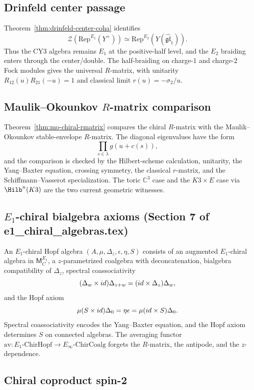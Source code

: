 \documentclass[11pt]{article}
\newcommand{\fgl}{\mathfrak{gl}}
\newcommand{\cZ}{\mathcal{Z}}
\newcommand{\Rep}{\mathrm{Rep}}
\newcommand{\C}{\mathbb{C}}
\theoremstyle{plain}
\theoremstyle{definition}
\theoremstyle{remark}
\begin{document}
\subsection{Drinfeld center passage}

Theorem~\ref{thm:drinfeld-center-coha} identifies
\[
 \cZ(\Rep^{E_1}(Y^+))\simeq \Rep^{E_2}(Y(\widehat{\fgl}_1)).
\]
Thus the CY3 algebra remains $E_1$ at the positive-half level, and the
$E_2$ braiding enters through the center/double. The half-braiding on
charge-$1$ and charge-$2$ Fock modules gives the universal $R$-matrix,
with unitarity $R_{12}(u)R_{21}(-u)=1$ and classical limit
$r(u)=-\sigma_2/u$.

\subsection{Maulik--Okounkov $R$-matrix comparison}

Theorem~\ref{thm:mo-chiral-rmatrix} compares the chiral $R$-matrix with
the Maulik--Okounkov stable-envelope $R$-matrix. The diagonal
eigenvalues have the form
\[
 \prod_{s\in\lambda}g(u+c(s)),
\]
and the comparison is checked by the Hilbert-scheme calculation,
unitarity, the Yang--Baxter equation, crossing symmetry, the classical
$r$-matrix, and the Schiffmann--Vasserot specialization. The toric
$\C^3$ case and the $K3\times E$ case via $\Hilb^n(K3)$ are the two
current geometric witnesses.

\subsection{$E_1$-chiral bialgebra axioms (Section 7 of e1\_chiral\_algebras.tex)}

An $E_1$-chiral Hopf algebra
$(A,\mu,\Delta_z,\epsilon,\eta,S)$ consists of an augmented
$E_1$-chiral algebra in $\mathsf{M}^{E_1}_C$, a $z$-parametrized
coalgebra with deconcatenation, bialgebra compatibility of
$\Delta_z$, spectral coassociativity
\[
(\Delta_w\times id)\Delta_{z+w}=(id\times\Delta_z)\Delta_w,
\]
and the Hopf axiom
\[
\mu(S\times id)\Delta_0=\eta\epsilon=\mu(id\times S)\Delta_0.
\]
Spectral coassociativity encodes the Yang--Baxter equation, and the
Hopf axiom determines $S$ on connected algebras. The averaging functor
$\mathrm{av}\colon E_1\text{-}\mathrm{ChirHopf}\to
E_\infty\text{-}\mathrm{ChirCoalg}$ forgets the $R$-matrix, the
antipode, and the $z$-dependence.

\subsection{Chiral coproduct spin-2}
\end{document}
